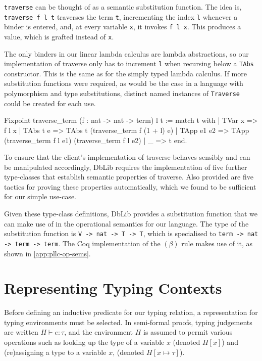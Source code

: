 \documentclass[]{unswthesis}
\let\c\texttt
\begin{document}
\begin{displayquote}
\c{traverse} can be thought of as a semantic substitution function. The idea is, \c{traverse f l t} traverses the term \c{t}, incrementing the index \c{l} whenever a binder is entered, and, at every variable \c{x}, it invokes \c{f l x}. This produces a value, which is grafted instead of \c{x}.
\end{displayquote}

The only binders in our linear lambda calculus are lambda abstractions, so our implementation of traverse only has to increment \c{l} when recursing below a \c{TAbs} constructor. This is the same as for the simply typed lambda calculus. If more substitution functions were required, as would be the case in a language with polymorphism and type substitutions, distinct named instances of \c{Traverse} could be created for each use.

\begin{coqcode}
Fixpoint traverse_term (f : nat -> nat -> term) l t :=
  match t with
  | TVar x =>
      f l x
  | TAbs t e =>
      TAbs t (traverse_term f (1 + l) e)
  | TApp e1 e2 =>
      TApp (traverse_term f l e1) (traverse_term f l e2)
  | _ => t
  end.
\end{coqcode}

To ensure that the client's implementation of traverse behaves sensibly and can be manipulated accordingly, DbLib requires the implementation of five further type-classes that establish semantic properties of traverse. Also provided are five tactics for proving these properties automatically, which we found to be sufficient for our simple use-case.

Given these type-class definitions, DbLib provides a substitution function that we can make use of in the operational semantics for our language. The type of the substitution function is \c{V -> nat -> T -> T}, which is specialised to \c{term -> nat -> term -> term}. The Coq implementation of the $(\beta)$ rule makes use of it, as shown in \cref{app:pllc-op-sems}.

\section{Representing Typing Contexts}
\label{sec:repr-ty-contexts}

Before defining an inductive predicate for our typing relation, a representation for typing environments must be selected. In semi-formal proofs, typing judgements are written $H \vdash e : \tau$, and the environment $H$ is assumed to permit various operations such as looking up the type of a variable $x$ (denoted $H[x]$) and (re)assigning a type to a variable $x$, (denoted $H[x \mapsto \tau]$).
\end{document}
